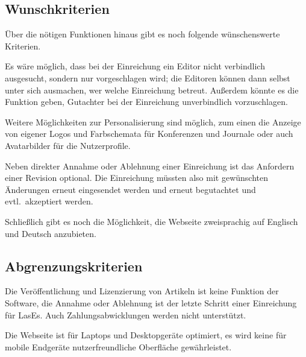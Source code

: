 \subsection{Wunschkriterien}

Über die nötigen Funktionen hinaus gibt es noch folgende wünschenswerte Kriterien.

Es wäre möglich, dass bei der Einreichung ein Editor nicht verbindlich ausgesucht, sondern nur vorgeschlagen wird;
die Editoren können dann selbst unter sich ausmachen, wer welche Einreichung betreut.
Außerdem könnte es die Funktion geben, Gutachter bei der Einreichung unverbindlich vorzuschlagen.

Weitere Möglichkeiten zur Personalisierung sind möglich,
zum einen die Anzeige von eigener Logos und Farbschemata für Konferenzen und Journale oder auch Avatarbilder für die Nutzerprofile.

Neben direkter Annahme oder Ablehnung einer Einreichung ist das Anfordern einer Revision optional.
Die Einreichung müssten also mit gewünschten Änderungen erneut eingesendet werden und erneut begutachtet und evtl.\ akzeptiert werden.

Schließlich gibt es noch die Möglichkeit, die Webseite zweisprachig auf Englisch und Deutsch anzubieten.

\subsection{Abgrenzungskriterien}

Die Veröffentlichung und Lizenzierung von Artikeln ist keine Funktion der Software,
die Annahme oder Ablehnung ist der letzte Schritt einer Einreichung für LasEs.
Auch Zahlungsabwicklungen werden nicht unterstützt.

Die Webseite ist für Laptops und Desktopgeräte optimiert, es wird keine für mobile Endgeräte nutzerfreundliche Oberfläche gewährleistet.